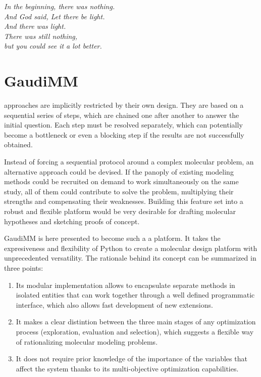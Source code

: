 \begin{savequote}[0.6\textwidth]
	\itshape In the beginning, there was nothing. \\
	\itshape And God said, Let there be light. \\
	\itshape And there was light. \\
	\itshape There was still nothing, \\
	\itshape but you could see it a lot better.
\end{savequote}

\chapter{GaudiMM}
\label{chap:04}


 approaches are implicitly restricted by their own design. They are based on a sequential series of steps, which are chained one after another to answer the initial question. Each step must be resolved separately, which can potentially become a bottleneck or even a blocking step if the results are not successfully obtained.


Instead of forcing a sequential protocol around a complex molecular problem, an alternative approach could be devised. If the panoply of existing modeling methods could be recruited on demand to work simultaneously on the same study, all of them could contribute to solve the problem, multiplying their strengths and compensating their weaknesses. Building this feature set into a robust and flexible platform would be very desirable for drafting molecular hypotheses and sketching proofs of concept.

GaudiMM is here presented to become such a a platform. It takes the expresiveness and flexibility of Python to create a molecular design platform with unprecedented versatility. The rationale behind its concept can be summarized in three points:

\begin{enumerate}
	\item Its modular implementation allows to encapsulate separate methods in isolated entities that can work together through a well defined programmatic interface, which also allows fast development of new extensions.

	\item It makes a clear distintion between the three main stages of any optimization process (exploration, evaluation and selection), which suggests a flexible way of rationalizing molecular modeling problems.

	\item It does not require prior knowledge of the importance of the variables that affect the system thanks to its multi-objective optimization capabilities.
\end{enumerate}

